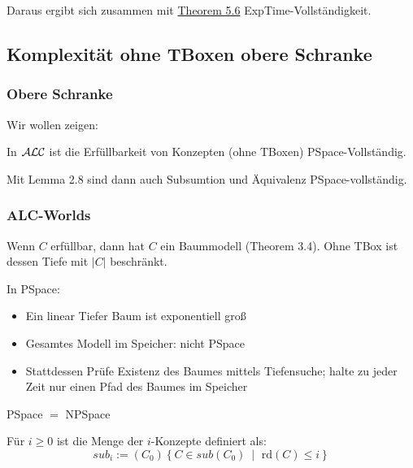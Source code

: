 Daraus ergibt sich zusammen mit \protect\hyperlink{theorem-5.6}{Theorem 5.6} ExpTime-Vollständigkeit.

\subsection{Komplexität ohne TBoxen obere
Schranke}\label{komplexituxe4t-ohne-tboxen-obere-schranke}

\subsubsection{Obere Schranke}

Wir wollen zeigen:

\begin{theorem}
In $\mathcal{A}\mathcal{L}\mathcal{C}$ ist die Erfüllbarkeit von Konzepten (ohne TBoxen)
PSpace-Vollständig.
\end{theorem}

Mit Lemma 2.8 sind dann auch Subsumtion und Äquivalenz PSpace-vollständig.

\subsubsection{ALC-Worlds}\label{alc-worlds}

Wenn $C$ erfüllbar, dann hat $C$ ein Baummodell (Theorem 3.4). Ohne TBox ist dessen Tiefe mit $\left| C \right|$ beschränkt. 

In PSpace:

\begin{itemize}
\item
  Ein linear Tiefer Baum ist exponentiell groß
\item
  Gesamtes Modell im Speicher: nicht PSpace
\item
  Stattdessen Prüfe Existenz des Baumes mittels Tiefensuche; halte zu
  jeder Zeit nur einen Pfad des Baumes im Speicher
\end{itemize}

\begin{theorem}
PSpace $=$ NPSpace
\end{theorem}

\begin{definition}[$i$-Konzepte]

Für $i \geq 0$ ist die Menge der $i$-Konzepte definiert als:
$$sub_{i} := \left( C_{0} \right) \left\{ C \in sub\left( C_{0} \right)\  \middle| \text{\ rd}\left( C \right) \leq i \right\}$$
\end{definition}

